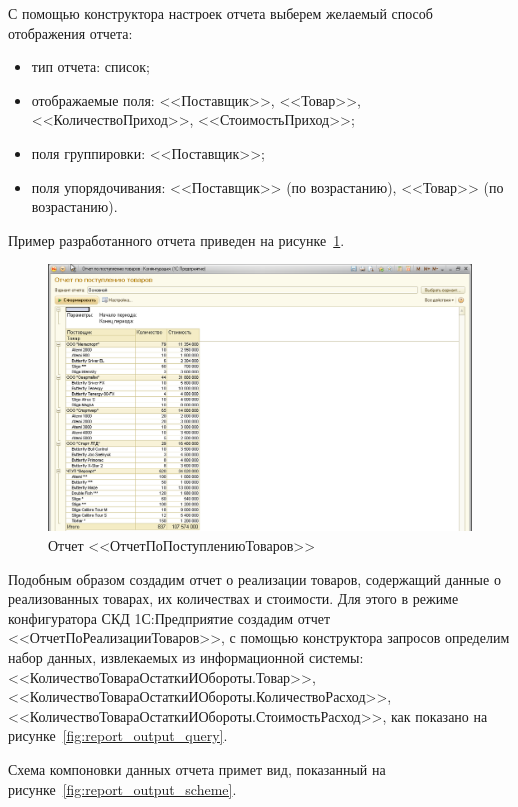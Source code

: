 \pagebreak

С помощью конструктора настроек отчета выберем желаемый способ отображения
отчета:
\begin{itemize}
\item тип отчета: список;
\item отображаемые поля: <<Поставщик>>, <<Товар>>,
  <<КоличествоПриход>>, <<СтоимостьПриход>>;
\item поля группировки: <<Поставщик>>;
\item поля упорядочивания:
  <<Поставщик>> (по возрастанию),
  <<Товар>> (по возрастанию).
\end{itemize}

Пример разработанного отчета приведен на рисунке~\ref{fig:report_input}.

\begin{figure}[h!]
  \centering
  \includegraphics[width=150mm]{pic/report_input}
  \caption{Отчет <<ОтчетПоПоступлениюТоваров>>}
  \label{fig:report_input}
\end{figure}


Подобным образом создадим отчет о реализации товаров,
содержащий данные о реализованных товарах, их количествах и стоимости.
Для этого в режиме конфигуратора СКД 1С:Предприятие создадим отчет
<<ОтчетПоРеализацииТоваров>>, с помощью конструктора запросов
определим набор данных, извлекаемых из информационной системы:
<<КоличествоТовараОстаткиИОбороты.Товар>>,
<<КоличествоТовараОстаткиИОбороты.КоличествоРасход>>,
<<КоличествоТовараОстаткиИОбороты.СтоимостьРасход>>,
как показано на рисунке~\ref{fig:report_output_query}.

Схема компоновки данных отчета примет вид,
показанный на рисунке~\ref{fig:report_output_scheme}.

